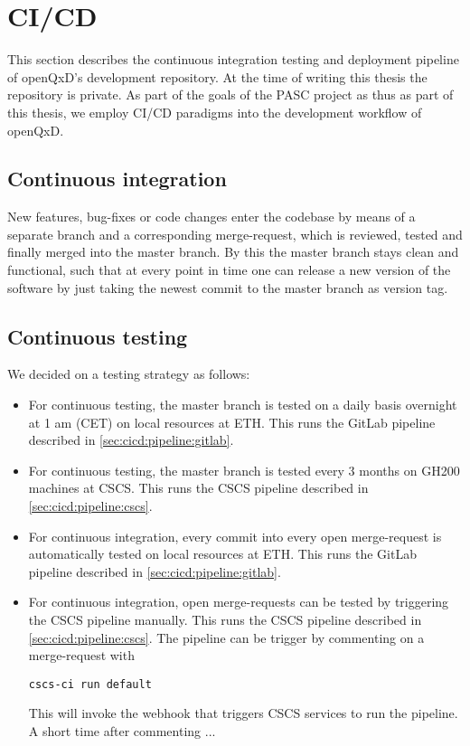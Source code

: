 
\chapter{CI/CD}
\label{ch:p1:cicd}

This section describes the continuous integration testing and deployment pipeline of openQxD's development repository\cite{gitlab:openqxd-devel}. At the time of writing this thesis the repository is private. As part of the goals of the PASC project\cite{pasc:project} as thus as part of this thesis, we employ CI/CD paradigms into the development workflow of openQxD.

\section{Continuous integration}

New features, bug-fixes or code changes enter the codebase by means of a separate branch and a corresponding merge-request, which is reviewed, tested and finally merged into the master branch. By this the master branch stays clean and functional, such that at every point in time one can release a new version of the software by just taking the newest commit to the master branch as version tag.

\section{Continuous testing}
\label{sec:cicd:testing}

We decided on a testing strategy as follows:

\begin{itemize}
    \item For continuous testing, the master branch is tested on a daily basis overnight at 1 am (CET) on local resources at ETH. This runs the GitLab pipeline described in \cref{sec:cicd:pipeline:gitlab}.
    \item For continuous testing, the master branch is tested every 3 months on GH200 machines at CSCS. This runs the CSCS pipeline described in \cref{sec:cicd:pipeline:cscs}.
    \item For continuous integration, every commit into every open merge-request is automatically tested on local resources at ETH. This runs the GitLab pipeline described in \cref{sec:cicd:pipeline:gitlab}.
    \item{For continuous integration, open merge-requests can be tested by triggering the CSCS pipeline manually. This runs the CSCS pipeline described in \cref{sec:cicd:pipeline:cscs}. The pipeline can be trigger by commenting on a merge-request with
    \begin{verbatim}
cscs-ci run default
    \end{verbatim}
    This will invoke the webhook that triggers CSCS services to run the pipeline. A short time after commenting ...
    }
\end{itemize}

